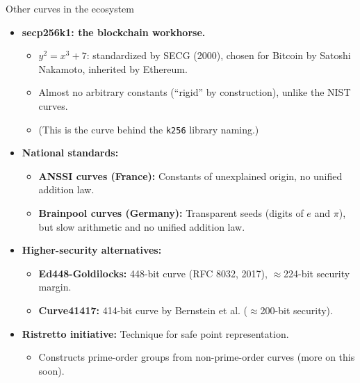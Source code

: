 \ifdefined\PRESENTATION\else\PassOptionsToClass{handout}{beamer}\fi\documentclass[aspectratio=169, lualatex]{beamer}
\begin{document}
\begin{frame}{Other curves in the ecosystem}
	\begin{itemize}
		\item \textbf{secp256k1: the blockchain workhorse.}
		      \begin{itemize}
			      \item $y^2 = x^3 + 7$: standardized by SECG (2000), chosen for Bitcoin by Satoshi Nakamoto, inherited by Ethereum.
			      \item Almost no arbitrary constants (``rigid'' by construction), unlike the NIST curves.
			      \item (This is the curve behind the \texttt{k256} library naming.)
		      \end{itemize}
		\item \textbf{National standards:}
		      \begin{itemize}
			      \item \textbf{ANSSI curves (France):} Constants of unexplained origin, no unified addition law.
			      \item \textbf{Brainpool curves (Germany):} Transparent seeds (digits of $e$ and $\pi$), but slow arithmetic and no unified addition law.
		      \end{itemize}
		\item \textbf{Higher-security alternatives:}
		      \begin{itemize}
			      \item \textbf{Ed448-Goldilocks:} 448-bit curve (RFC 8032, 2017), $\approx$224-bit security margin.
			      \item \textbf{Curve41417:} 414-bit curve by Bernstein et al. ($\approx$200-bit security).
		      \end{itemize}
		\item \textbf{Ristretto initiative:} Technique for safe point representation.
		      \begin{itemize}
			      \item Constructs prime-order groups from non-prime-order curves (more on this soon).
		      \end{itemize}
	\end{itemize}
\end{frame}
\end{document}

